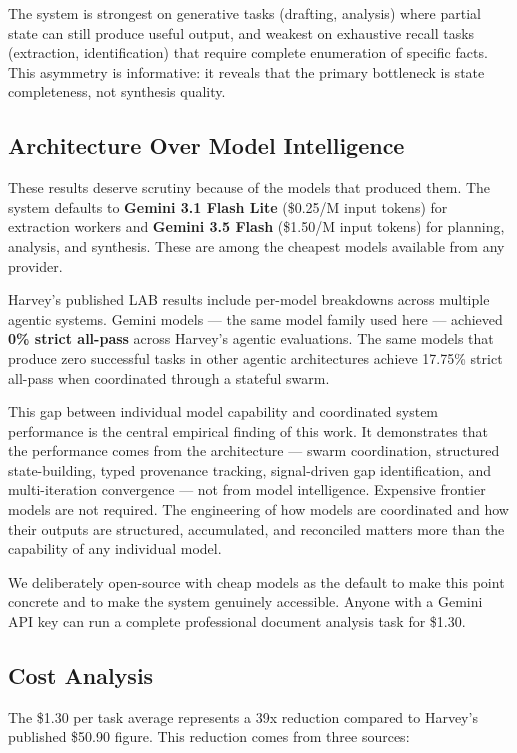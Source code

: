\documentclass[11pt,a4paper]{article}
\begin{document}
The system is strongest on generative tasks (drafting, analysis) where partial state can still produce useful output, and weakest on exhaustive recall tasks (extraction, identification) that require complete enumeration of specific facts. This asymmetry is informative: it reveals that the primary bottleneck is state completeness, not synthesis quality.

\subsection{Architecture Over Model Intelligence}

These results deserve scrutiny because of the models that produced them. The system defaults to \textbf{Gemini 3.1 Flash Lite} (\$0.25/M input tokens) for extraction workers and \textbf{Gemini 3.5 Flash} (\$1.50/M input tokens) for planning, analysis, and synthesis. These are among the cheapest models available from any provider.

Harvey's published LAB results include per-model breakdowns across multiple agentic systems. Gemini models — the same model family used here — achieved \textbf{0\% strict all-pass} across Harvey's agentic evaluations. The same models that produce zero successful tasks in other agentic architectures achieve 17.75\% strict all-pass when coordinated through a stateful swarm.

This gap between individual model capability and coordinated system performance is the central empirical finding of this work. It demonstrates that the performance comes from the architecture — swarm coordination, structured state-building, typed provenance tracking, signal-driven gap identification, and multi-iteration convergence — not from model intelligence. Expensive frontier models are not required. The engineering of how models are coordinated and how their outputs are structured, accumulated, and reconciled matters more than the capability of any individual model.

We deliberately open-source with cheap models as the default to make this point concrete and to make the system genuinely accessible. Anyone with a Gemini API key can run a complete professional document analysis task for \$1.30.

\subsection{Cost Analysis}

The \$1.30 per task average represents a 39x reduction compared to Harvey's published \$50.90 figure. This reduction comes from three sources:
\end{document}
